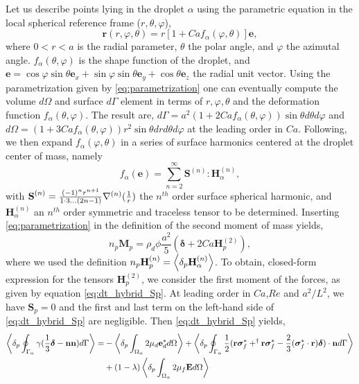 Let us describe points lying in the droplet $\alpha$ using the parametric equation in the local spherical reference frame ($r,\theta,\varphi$),
\begin{equation}
    \textbf{r}(r,\varphi,\theta) = r [1+ Ca f_\alpha(\varphi,\theta)] \textbf{e},
    \label{eq:parametrization}
\end{equation}
where $0<r<a$ is the radial parameter, $\theta$ the polar angle, and $\varphi$ the azimutal angle. 
$f_\alpha(\theta,\varphi)$ is the shape function of the droplet, and $\textbf{e} = \cos\varphi\sin\theta \textbf{e}_x + \sin\varphi\sin\theta\textbf{e}_y+ \cos\theta \textbf{e}_z$ the radial unit vector. 
Using the parametrization given by \ref{eq:parametrization} one can eventually compute the volume $d\Omega$ and surface $d\Gamma$ element in terms of $r,\varphi,\theta$ and the deformation function $f_\alpha(\theta,\varphi)$.
The result are, $d\Gamma =a^2 (1+2Ca f_\alpha(\theta,\varphi)) \sin\theta d\theta d\varphi$ and $d\Omega = (1+3Ca f_\alpha(\theta,\varphi)) r^2\sin\theta drd\theta d\varphi$ at the leading order in $Ca$. 
Following, \citet{nadim1996concise,nadim1991motion} we then expand $f_\alpha(\varphi,\theta)$ in a series of surface harmonics centered at the droplet center of mass, namely 
\begin{equation}
    f_\alpha(\textbf{e}) = 
    \sum_{n=2}^\infty\textbf{S}^{(n)}:\textbf{H}_\alpha^{(n)},
    \label{eq:f_definition}
\end{equation} 
with $\textbf{S}^{(n)} = \frac{(-1)^n r^{n+1}}{1\cdot3\ldots(2n-1)}\mathbf{\nabla}^{(n)}(\frac{1}{r})$ the $n^{th}$ order surface spherical harmonic, and $\textbf{H}_\alpha^{(n)}$ an $n^{th}$ order symmetric and traceless tensor to be determined. 
Inserting \ref{eq:parametrization} in the definition of the second moment of mass yields,
\begin{equation}
    n_p \textbf{M}_p = \rho_d\phi \frac{a^2}{5}(\bm\delta+2Ca \textbf{H}_p^{(2)}),
    \label{eq:second_moment_of_mass1}
    \end{equation}
where we used the definition $n_p \textbf{H}_p^{(n)} = \left<\delta_{p} \textbf{H}_\alpha^{(n)}\right>$. 
To obtain, closed-form expression for the tensors $\textbf{H}_p^{(2)}$, we consider the first moment of the forces, as given by equation \ref{eq:dt_hybrid_Sp}.
At leading order in $Ca$,$Re$ and $a^2/L^2$, we have $\textbf{S}_p =0$ and the first and last term on the left-hand side of \ref{eq:dt_hybrid_Sp} are negligible.
Then \ref{eq:dt_hybrid_Sp} yields,
\begin{align}
\pSavg{\gamma (\frac{1}{3}\bm\delta - \textbf{nn})}
=&- \pOavg{2 \mu_d\textbf{e}_d^*} \nonumber
+\pSavg{\frac{1}{2}(\textbf{r}\bm\sigma_f^*+^\dagger\textbf{r}\bm\sigma_f^*-\frac{2}{3}(\bm\sigma_f^* \cdot \textbf{r})\bm\delta)\cdot \textbf{n}}\nonumber\\
&+ (1-\lambda)\pOavg{2\mu_f\textbf{E}}\nonumber 
\label{eq:dt_hybrid_Sp1}
\end{align}

